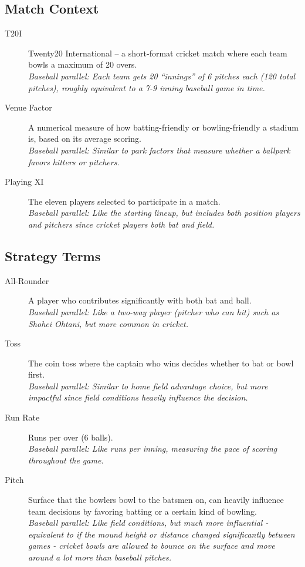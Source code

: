 \documentclass{article}[12pt]
\begin{document}
\subsection*{Match Context}
\begin{description}
    \item[T20I] Twenty20 International – a short-format cricket match where each team bowls a maximum of 20 overs.\\
    \textit{Baseball parallel: Each team gets 20 ``innings'' of 6 pitches each (120 total pitches), roughly equivalent to a 7-9 inning baseball game in time.}

    \item[Venue Factor] A numerical measure of how batting-friendly or bowling-friendly a stadium is, based on its average scoring.\\
    \textit{Baseball parallel: Similar to park factors that measure whether a ballpark favors hitters or pitchers.}

    \item[Playing XI] The eleven players selected to participate in a match.\\
    \textit{Baseball parallel: Like the starting lineup, but includes both position players and pitchers since cricket players both bat and field.}
\end{description}

\subsection*{Strategy Terms}
\begin{description}
    \item[All-Rounder] A player who contributes significantly with both bat and ball.\\
    \textit{Baseball parallel: Like a two-way player (pitcher who can hit) such as Shohei Ohtani, but more common in cricket.}

    \item[Toss] The coin toss where the captain who wins decides whether to bat or bowl first.\\
    \textit{Baseball parallel: Similar to home field advantage choice, but more impactful since field conditions heavily influence the decision.}

    \item[Run Rate] Runs per over (6 balls).\\
    \textit{Baseball parallel: Like runs per inning, measuring the pace of scoring throughout the game.}

    \item[Pitch] Surface that the bowlers bowl to the batsmen on, can heavily influence team decisions by favoring batting or a certain kind of bowling.\\
    \textit{Baseball parallel: Like field conditions, but much more influential - equivalent to if the mound height or distance changed significantly between games - cricket bowls are allowed to bounce on the surface and move around a lot more than baseball pitches.}
\end{description}
\end{document}
